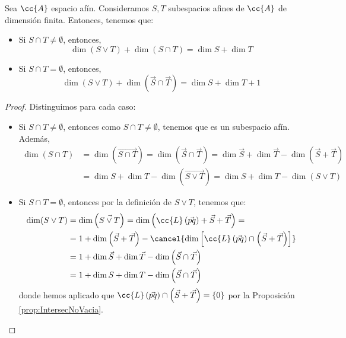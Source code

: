 \begin{teo}[Dimensiones]
    Sea $\cc{A}$ espacio afín. Consideramos $S,T$ subespacios afines de $\cc{A}$ de dimensión finita. Entonces, tenemos que:
    \begin{itemize}
        \item Si $S\cap T\neq \emptyset$, entonces,
        \begin{equation*}
            \dim \left(S\vee T\right)+\dim (S\cap T)= \dim S + \dim T
        \end{equation*}

        \item Si $S\cap T= \emptyset$, entonces,
        \begin{equation*}
            \dim (S\vee T)+\dim\left(\vec{S} \cap \vec{T}\right)=\dim S + \dim T +1
        \end{equation*}
    \end{itemize}
\end{teo}
\begin{proof} Distinguimos para cada caso:
    \begin{itemize}
        \item Si $S\cap T\neq \emptyset$, entonces como $S\cap T\neq \emptyset$, tenemos que es un subespacio afín. Además,
    \begin{equation*}\begin{split}
            \dim (S\cap T)
            &=\dim\left(\vec{S\cap T}\right)
            = \dim\left(\vec{S}\cap \vec{T}\right)
            = \dim \vec{S} + \dim \vec{T} - \dim \left(\vec{S}+\vec{T}\right)\\
            &= \dim S + \dim T - \dim \left(\vec{S\vee T}\right)
            = \dim S + \dim T - \dim \left(S\vee T\right)
        \end{split}\end{equation*}

        \item Si $S\cap T= \emptyset$, entonces por la definición de $S\vee T$, tenemos que:
        \begin{equation*}\begin{split}
            \dim (S\vee T)
            &=\dim\left(\vec{S\vee T}\right)
            = \dim\left(\cc{L}\left(\vec{pq}\right) + \vec{S} + \vec{T}\right)
            =\\
            &= 1 + \dim\left(\vec{S} + \vec{T}\right) - \cancel{\dim\left[\cc{L}\left(\vec{pq}\right)\cap \left(\vec{S} + \vec{T}\right)\right]}\\
            &= 1 + \dim \vec{S} + \dim\vec{T} - \dim\left(\vec{S} \cap \vec{T}\right) \\
            &= 1 + \dim S + \dim T - \dim\left(\vec{S} \cap \vec{T}\right)
        \end{split}\end{equation*}
        donde hemos aplicado que $\cc{L}\left(\vec{pq}\right)\cap \left(\vec{S} + \vec{T}\right)=\{0\}$ por la Proposición \ref{prop:IntersecNoVacia}.
    \end{itemize}
\end{proof}

